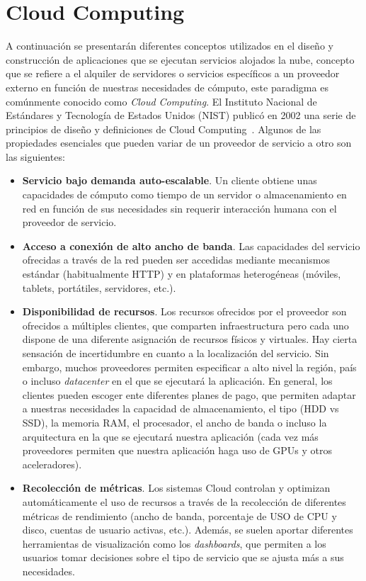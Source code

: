 \section{Cloud Computing}\label{sec:cloud}
A continuación se presentarán diferentes conceptos utilizados en el diseño y construcción de aplicaciones que se ejecutan servicios alojados la nube, concepto que se refiere a el alquiler de servidores o servicios específicos a un proveedor externo en función de nuestras necesidades de cómputo, este paradigma es comúnmente conocido como \emph{Cloud Computing}. El Instituto Nacional de Estándares y Tecnología de Estados Unidos (NIST) publicó en 2002 una serie de principios de diseño y definiciones de Cloud Computing~\cite{cloudfunds}. Algunos de las propiedades esenciales que pueden variar de un proveedor de servicio a otro son las siguientes:

\begin{itemize}
\item \textbf{Servicio bajo demanda auto-escalable}. Un cliente obtiene unas capacidades de cómputo como tiempo de un servidor o almacenamiento en red en función de sus necesidades sin requerir interacción humana con el proveedor de servicio.
\item \textbf{Acceso a conexión de alto ancho de banda}. Las capacidades del servicio ofrecidas a través de la red pueden ser accedidas mediante mecanismos estándar (habitualmente HTTP) y en plataformas heterogéneas (móviles, tablets, portátiles, servidores, etc.).
\item \textbf{Disponibilidad de recursos}. Los recursos ofrecidos por el proveedor son ofrecidos a múltiples clientes, que comparten infraestructura pero cada uno dispone de una diferente asignación de recursos físicos y virtuales. Hay cierta sensación de incertidumbre en cuanto a la localización del servicio. Sin embargo, muchos proveedores permiten especificar a alto nivel la región, país o incluso \textit{datacenter} en el que se ejecutará la aplicación. En general, los clientes pueden escoger ente diferentes planes de pago, que permiten adaptar a nuestras necesidades la capacidad de almacenamiento, el tipo (HDD vs SSD), la memoria RAM, el procesador, el ancho de banda o incluso la arquitectura en la que se ejecutará nuestra aplicación (cada vez más proveedores permiten que nuestra aplicación haga uso de GPUs y otros aceleradores).
\item \textbf{Recolección de métricas}. Los sistemas Cloud controlan y optimizan automáticamente el uso de recursos a través de la recolección de diferentes métricas de rendimiento (ancho de banda, porcentaje de USO de CPU y disco, cuentas de usuario activas, etc.). Además, se suelen aportar diferentes herramientas de visualización como los \textit{dashboards}, que permiten a los usuarios tomar decisiones sobre el tipo de servicio que se ajusta más a sus necesidades.
\end{itemize}

